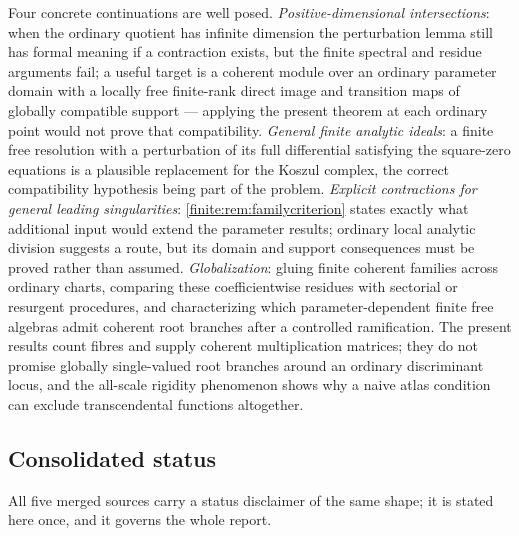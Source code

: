 \documentclass[11pt,letterpaper]{article}
\theoremstyle{definition}
\theoremstyle{remark}
\numberwithin{equation}{section}
\begin{document}
Four concrete continuations are well posed. \emph{Positive-dimensional intersections}: when the ordinary quotient has infinite dimension the perturbation lemma still has formal meaning if a contraction exists, but the finite spectral and residue arguments fail; a useful target is a coherent module over an ordinary parameter domain with a locally free finite-rank direct image and transition maps of globally compatible support --- applying the present theorem at each ordinary point would not prove that compatibility. \emph{General finite analytic ideals}: a finite free resolution with a perturbation of its full differential satisfying the square-zero equations is a plausible replacement for the Koszul complex, the correct compatibility hypothesis being part of the problem. \emph{Explicit contractions for general leading singularities}: \cref{finite:rem:familycriterion} states exactly what additional input would extend the parameter results; ordinary local analytic division suggests a route, but its domain and support consequences must be proved rather than assumed. \emph{Globalization}: gluing finite coherent families across ordinary charts, comparing these coefficientwise residues with sectorial or resurgent procedures, and characterizing which parameter-dependent finite free algebras admit coherent root branches after a controlled ramification. The present results count fibres and supply coherent multiplication matrices; they do not promise globally single-valued root branches around an ordinary discriminant locus, and the all-scale rigidity phenomenon shows why a naive atlas condition can exclude transcendental functions altogether.

\subsection{Consolidated status}
\label{finite:sec:status}

All five merged sources carry a status disclaimer of the same shape; it is stated here once, and it governs the whole report.
\end{document}
